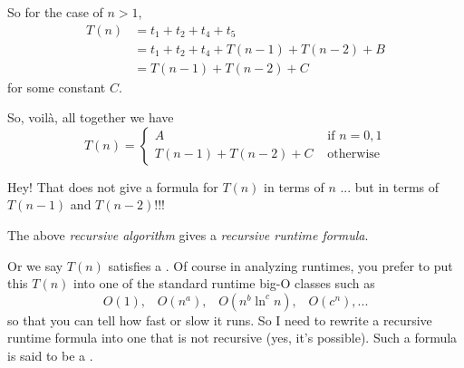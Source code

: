 So for the case of $n > 1$,
\begin{align*}
T(n) 
&= t_1 + t_2 + t_4 + t_5 \\
&= t_1 + t_2 + t_4 + T(n-1) + T(n-2) + B \\
&= T(n-1) + T(n-2) + C
\end{align*}
for some constant $C$.

So, voil\`a, all together we have
\[
T(n) 
=
\begin{cases}
A                       & \text{ if $n = 0, 1$} \\
T(n - 1) + T(n - 2) + C & \text{ otherwise}
\end{cases}
\]

Hey! 
That does not give a formula for $T(n)$ in terms of $n$ ...
but in terms of $T(n - 1)$ and $T(n - 2)$!!!

The above \textit{recursive algorithm} gives a
\textit{recursive runtime formula}.

Or we say $T(n)$ satisfies a .
Of course in analyzing runtimes, you prefer to put this
$T(n)$ into one of the standard runtime big-O classes such as
\[
O(1), \,\,\,\,\,
O(n^a), \,\,\,\,\,
O(n^b\ln^c n), \,\,\,\,\, 
O(c^n), ...
\]
so that you can tell how fast or slow it runs.
So I need to rewrite a recursive runtime formula into one that is not
recursive (yes, it's possible).
Such a formula is said to be a . 

